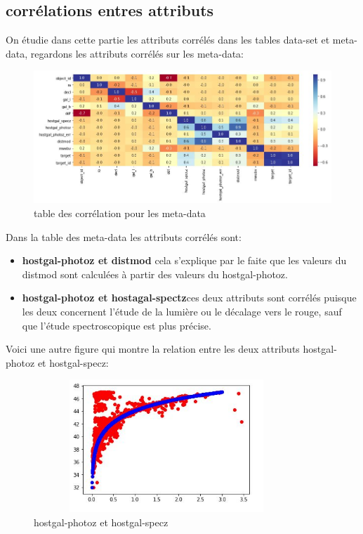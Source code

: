 \subsection{corrélations entres attributs}
On étudie dans cette partie les attributs corrélés dans les tables data-set et meta-data, regardons les attributs corrélés sur les meta-data: 
\begin{figure}[!h]
    \centering
    \includegraphics[width=17cm,height=5cm]{report/figures/correlation.jpg}
    \caption{table des corrélation pour les meta-data}
    \label{fig:my_label}
\end{figure}

Dans la table des meta-data les attributs corrélés sont: 
\begin{itemize}
    \item \textbf{hostgal-photoz et distmod} cela s'explique par le faite que les valeurs du distmod sont calculées à partir des valeurs du hostgal-photoz.
    \item \textbf{hostgal-photoz et hostagal-spectz}ces deux attributs sont corrélés puisque les deux concernent l'étude de la lumière ou le décalage vers le rouge, sauf que l'étude spectroscopique est plus précise.
\end{itemize}
Voici une autre figure qui montre la relation entre les deux attributs hostgal-photoz et hostgal-specz:

\begin{figure}[!h]
    \centering
    \includegraphics[width=10cm,height=5cm]{report/figures/redshift.jpg}
    \caption{hostgal-photoz et hostgal-specz}
    \label{fig:my_label}
\end{figure}

